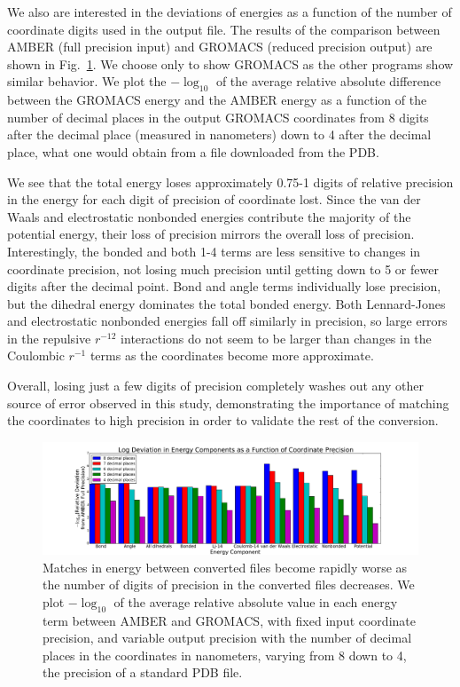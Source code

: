 We also are interested in the deviations of energies as a function of
the number of coordinate digits used in the output file. The results of the
comparison between AMBER (full precision input) and GROMACS (reduced
precision output) are shown in Fig.~\ref{fig:precision}.  We choose
only to show GROMACS as the other programs show similar behavior. We
plot the $-\log_{10}$ of the average relative absolute difference
between the GROMACS energy and the AMBER energy as a function of the
number of decimal places in the output GROMACS coordinates from 8
digits after the decimal place (measured in nanometers) down to 4
after the decimal place, what one would obtain from a file downloaded
from the PDB.  

We see that the total energy loses approximately 0.75-1 digits of
relative precision in the energy for each digit of precision of
coordinate lost. Since the van der Waals and electrostatic nonbonded
energies contribute the majority of the potential energy, their loss
of precision mirrors the overall loss of precision. Interestingly, the
bonded and both 1-4 terms are less sensitive to changes in coordinate
precision, not losing much precision until getting down to 5 or fewer
digits after the decimal point. Bond and angle terms individually lose
precision, but the dihedral energy dominates the total bonded energy.
Both Lennard-Jones and electrostatic nonbonded energies fall off
similarly in precision, so large errors in the repulsive $r^{-12}$
interactions do not seem to be larger than changes in the Coulombic
$r^{-1}$ terms as the coordinates become more approximate.

Overall, losing just a few digits of precision completely washes out
any other source of error observed in this study, demonstrating the
importance of matching the coordinates to high precision in order to
validate the rest of the conversion.

\begin{figure}[h]
\includegraphics[width=\textwidth]{precisioncomparison.pdf}   
\caption{Matches in energy between converted files become rapidly
  worse as the number of digits of precision in the converted files
  decreases. We plot $-\log_{10}$ of the average relative absolute
  value in each energy term between AMBER and GROMACS, with fixed
  input coordinate precision, and variable output precision with the
  number of decimal places in the coordinates in nanometers, varying
  from 8 down to 4, the precision of a standard PDB file.
\label{fig:precision}}
\end{figure}

